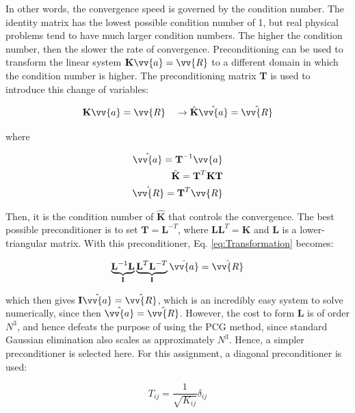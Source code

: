 \documentclass[10pt]{article}
\begin{document}
In other words, the convergence speed is governed by the condition number. The identity matrix has the lowest possible condition number of 1, but real physical problems tend to have much larger condition numbers. The higher the condition number, then the slower the rate of convergence. Preconditioning can be used to transform the linear system \(\textbf{K}\vv{a}=\vv{R}\) to a different domain in which the condition number is higher. The preconditioning matrix \textbf{T} is used to introduce this change of variables:

\begin{equation}
\label{eq:Transformation}
\textbf{K}\vv{a}=\vv{R}\quad\rightarrow\hat{\textbf{K}}\hat{\vv{a}}=\hat{\vv{R}}
\end{equation}

where

\begin{equation}
\label{eq:TransformationSpecs}
\begin{aligned}
\hat{\vv{a}}=\textbf{T}^{-1}\vv{a}\\
\hat{\textbf{K}}=\textbf{T}^{T}\textbf{K}\textbf{T}\\
\hat{\vv{R}}=\textbf{T}^T\vv{R}\\
\end{aligned}
\end{equation}

Then, it is the condition number of \(\hat{\textbf{K}}\) that controls the convergence. The best possible preconditioner is to set \(\textbf{T}=\textbf{L}^{-T}\), where \(\textbf{L}\textbf{L}^T=\textbf{K}\) and \textbf{L} is a lower-triangular matrix. With this preconditioner, Eq. \eqref{eq:Transformation} becomes:

\begin{equation}
\label{eq:Transformation2}
\underbrace{\textbf{L}^{-1}\textbf{L}}_\text{\textbf{I}}\underbrace{\textbf{L}^T\textbf{L}^{-T}}_\text{\textbf{I}}\hat{\vv{a}}=\hat{\vv{R}}
\end{equation}

which then gives \(\textbf{I}\hat{\vv{a}}=\hat{\vv{R}}\), which is an incredibly easy system to solve numerically, since then \(\hat{\vv{a}}=\hat{\vv{R}}\). However, the cost to form \(\textbf{L}\) is of order \(N^3\), and hence defeats the purpose of using the PCG method, since standard Gaussian elimination also scales as approximately \(N^3\). Hence, a simpler preconditioner is selected here. For this assignment, a diagonal preconditioner is used:

\begin{equation}
T_{ij}=\frac{1}{\sqrt{K_{ij}}}\delta_{ij}
\end{equation}
\end{document}
